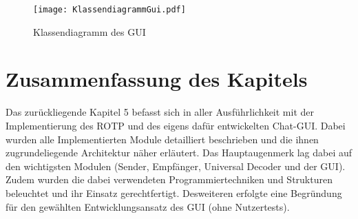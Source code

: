 \begin{figure}[H]
	\centering
	\texttt{[image: KlassendiagrammGui.pdf]}
	\caption{Klassendiagramm des GUI}
	\label{fig:KlassendiagrammGui}
\end{figure}

\section{Zusammenfassung des Kapitels}

Das zur{\"u}ckliegende Kapitel 5 befasst sich in aller Ausf{\"u}hrlichkeit mit
der Implementierung des \gls{ROTP} und des eigens daf{\"u}r entwickelten
Chat-GUI.
Dabei wurden alle Implementierten Module detailliert beschrieben und die ihnen
zugrundeliegende Architektur n{\"a}her erl{\"a}utert. Das Hauptaugenmerk lag
dabei auf den wichtigsten Modulen (Sender, Empf{\"a}nger, Universal Decoder
und der \gls{GUI}). Zudem wurden die dabei verwendeten Programmiertechniken und
Strukturen beleuchtet und ihr Einsatz gerechtfertigt. Desweiteren erfolgte eine
Begr{\"u}ndung f{\"u}r den gew{\"a}hlten Entwicklungsansatz des GUI (ohne
Nutzertests).
